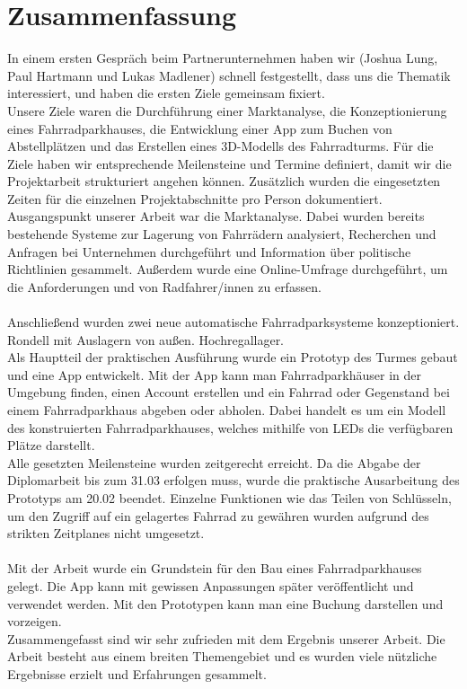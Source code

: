 \section{Zusammenfassung}

In einem ersten Gespräch beim Partnerunternehmen haben wir (Joshua Lung, Paul Hartmann und Lukas Madlener) schnell festgestellt, dass uns die Thematik interessiert, und haben die ersten Ziele gemeinsam fixiert. \\
Unsere Ziele waren die Durchführung einer Marktanalyse, die Konzeptionierung eines Fahrradparkhauses, die Entwicklung einer App zum Buchen von Abstellplätzen und das Erstellen eines 3D-Modells des Fahrradturms. Für die Ziele haben wir entsprechende Meilensteine und Termine definiert, damit wir die Projektarbeit strukturiert angehen können. Zusätzlich wurden die eingesetzten Zeiten für die einzelnen Projektabschnitte pro Person dokumentiert.\\
Ausgangspunkt unserer Arbeit war die Marktanalyse. Dabei wurden bereits bestehende Systeme zur Lagerung von Fahrrädern analysiert, Recherchen und Anfragen bei Unternehmen durchgeführt und Information über politische Richtlinien gesammelt. Außerdem wurde eine Online-Umfrage durchgeführt, um die Anforderungen und von Radfahrer/innen zu erfassen.\\ \\
Anschließend wurden zwei neue automatische Fahrradparksysteme konzeptioniert. Rondell mit Auslagern von außen. Hochregallager.\\
Als Hauptteil der praktischen Ausführung wurde ein Prototyp des Turmes gebaut und eine App entwickelt. Mit der App kann man Fahrradparkhäuser in der Umgebung finden, einen Account erstellen und ein Fahrrad oder Gegenstand bei einem Fahrradparkhaus abgeben oder abholen. Dabei handelt es um ein Modell des konstruierten Fahrradparkhauses, welches mithilfe von LEDs die verfügbaren Plätze darstellt. \\
Alle gesetzten Meilensteine wurden zeitgerecht erreicht. Da die Abgabe der Diplomarbeit bis zum 31.03 erfolgen muss, wurde die praktische Ausarbeitung des Prototyps am 20.02 beendet. Einzelne Funktionen wie das Teilen von Schlüsseln, um den Zugriff auf ein gelagertes Fahrrad zu gewähren wurden aufgrund des strikten Zeitplanes nicht umgesetzt.\\ \\
Mit der Arbeit wurde ein Grundstein für den Bau eines Fahrradparkhauses gelegt. Die App kann mit gewissen Anpassungen später veröffentlicht und verwendet werden. Mit den Prototypen kann man eine Buchung darstellen und vorzeigen.\\
Zusammengefasst sind wir sehr zufrieden mit dem Ergebnis unserer Arbeit. Die Arbeit besteht aus einem breiten Themengebiet und es wurden viele nützliche Ergebnisse erzielt und Erfahrungen gesammelt.
